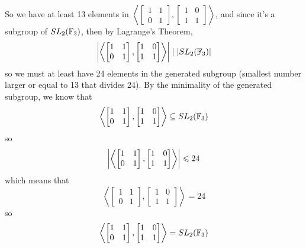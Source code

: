 \documentclass[12pt]{article}
\begin{document}
    So we have at least 13 elements in
    $\left\langle \begin{bmatrix} 1 & 1 \\ 0 & 1 \end{bmatrix},
    \begin{bmatrix} 1 & 0 \\ 1 & 1 \end{bmatrix} \right\rangle$,
    and since it's a subgroup of $SL_2(\mathbb{F}_3)$,
    then by Lagrange's Theorem,
    \[ \left|\left\langle \begin{bmatrix} 1 & 1 \\ 0 & 1 \end{bmatrix},
    \begin{bmatrix} 1 & 0 \\ 1 & 1 \end{bmatrix} \right\rangle \right| 
    \mid |SL_2(\mathbb{F}_3)| \]
    so we must at least have 24 elements in the generated subgroup
    (smallest number larger or equal to 13 that divides 24).
    By the minimality of the generated subgroup,
    we know that 
    \[ \left\langle \begin{bmatrix} 1 & 1 \\ 0 & 1 \end{bmatrix},
    \begin{bmatrix} 1 & 0 \\ 1 & 1 \end{bmatrix} \right\rangle
    \subseteq SL_2(\mathbb{F}_3) \]
    so
    \[\left| \left\langle \begin{bmatrix} 1 & 1 \\ 0 & 1 \end{bmatrix},
    \begin{bmatrix} 1 & 0 \\ 1 & 1 \end{bmatrix} \right\rangle \right|
    \leqslant 24\]
    which means that
    \[\left\langle \begin{bmatrix} 1 & 1 \\ 0 & 1 \end{bmatrix},
    \begin{bmatrix} 1 & 0 \\ 1 & 1 \end{bmatrix} \right\rangle = 24\]
    so
    \[\left\langle \begin{bmatrix} 1 & 1 \\ 0 & 1 \end{bmatrix},
    \begin{bmatrix} 1 & 0 \\ 1 & 1 \end{bmatrix} \right\rangle
    = SL_2(\mathbb{F}_3)\]
\end{document}
